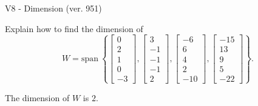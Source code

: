 \begin{exercise}
  \begin{exerciseTitle}V8 - Dimension (ver. 951)\end{exerciseTitle}
  \begin{exerciseStatement}
    Explain how to find the dimension of 
\[W=\mathrm{span}\ \left\{\left[\begin{array}{r}
0 \\
2 \\
1 \\
0 \\
-3
\end{array}\right] , \left[\begin{array}{r}
3 \\
-1 \\
-1 \\
-1 \\
2
\end{array}\right] , \left[\begin{array}{r}
-6 \\
6 \\
4 \\
2 \\
-10
\end{array}\right] , \left[\begin{array}{r}
-15 \\
13 \\
9 \\
5 \\
-22
\end{array}\right]\right\}.\]



  \end{exerciseStatement}
  \begin{exerciseAnswer}
   The dimension of \(W\) is  \(2\).
  


  \end{exerciseAnswer}
\end{exercise}